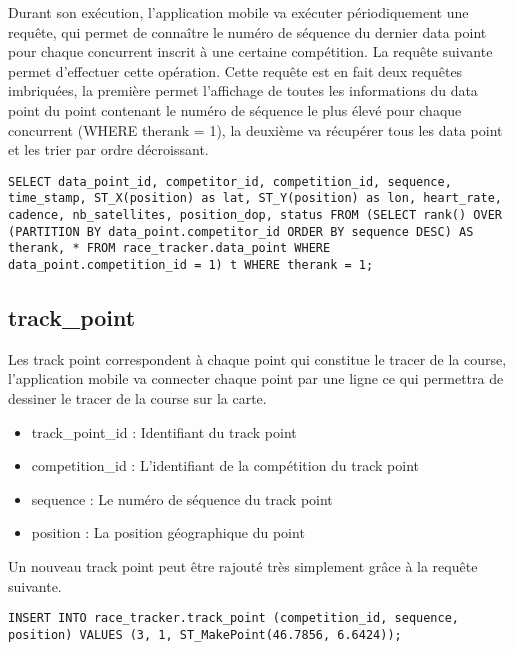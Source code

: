 Durant son exécution, l'application mobile va exécuter périodiquement une requête, qui permet de connaître le numéro de séquence du dernier data point pour chaque concurrent inscrit à une certaine compétition. La requête suivante permet d'effectuer cette opération. Cette requête est en fait deux requêtes imbriquées, la première permet l'affichage de toutes les informations du data point du point contenant le numéro de séquence le plus élevé pour chaque concurrent (WHERE therank = 1), la deuxième va récupérer tous les data point et les trier par ordre décroissant.

\begin{lstlisting}[style=SQLStyle]
SELECT data_point_id, competitor_id, competition_id, sequence, time_stamp, ST_X(position) as lat, ST_Y(position) as lon, heart_rate, cadence, nb_satellites, position_dop, status FROM (SELECT rank() OVER (PARTITION BY data_point.competitor_id ORDER BY sequence DESC) AS therank, * FROM race_tracker.data_point WHERE data_point.competition_id = 1) t WHERE therank = 1;
\end{lstlisting}

\subsection{track\_point}

Les track point correspondent à chaque point qui constitue le tracer de la course, l'application mobile va connecter chaque point par une ligne ce qui permettra de dessiner le tracer de la course sur la carte.

\begin{itemize}
\item track\_point\_id : Identifiant du track point
\item competition\_id : L'identifiant de la compétition du track point
\item sequence : Le numéro de séquence du track point
\item position : La position géographique du point
\end{itemize}

Un nouveau track point peut être rajouté très simplement grâce à la requête suivante.

\begin{lstlisting}[style=SQLStyle]
INSERT INTO race_tracker.track_point (competition_id, sequence, position) VALUES (3, 1, ST_MakePoint(46.7856, 6.6424));
\end{lstlisting}
